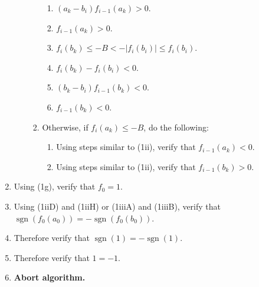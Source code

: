 \documentclass[twocolumn]{article}
\DeclareMathOperator{\sgn}{sgn}
\begin{document}
\begin{enumerate}
\begin{enumerate}
\begin{enumerate}
\begin{enumerate}
							\item $(a_k-b_i)f_{i-1}(a_k)>0$.
							\item $f_{i-1}(a_k)>0$.
							\item $f_i(b_k)\le-B<-\lvert f_i(b_i)\rvert\le f_i(b_i)$.
							\item $f_i(b_k)-f_i(b_i)<0$.
							\item $(b_k-b_i)f_{i-1}(b_k)<0$.
							\item $f_{i-1}(b_k)<0$.
						\end{enumerate}
						\item Otherwise, if $f_i(a_k)\le -B$, do the following:
						\begin{enumerate}
							\item Using steps similar to (1ii), verify that $f_{i-1}(a_k)<0$.
							\item Using steps similar to (1ii), verify that $f_{i-1}(b_k)>0$.
						\end{enumerate}
					\end{enumerate}
				\end{enumerate}
				\item Using (1g), verify that $f_0=1$.
				\item Using (1iiD) and (1iiH) or (1iiiA) and (1iiiB), verify that $\sgn(f_0(a_0))=-\sgn(f_0(b_0))$.
				\item Therefore verify that $\sgn(1)=-\sgn(1)$.
				\item Therefore verify that $1=-1$.
				\item \textbf{Abort algorithm.}
			\end{enumerate}
\end{document}
